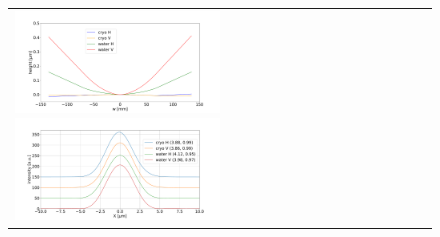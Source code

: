 \documentclass[aps,pra,showpacs,twocolumn,amsmath,amssymb,superscriptaddress,nofootinbib]{revtex4}
\begin{document}
\begin{figure}
\begin{center}
\begin{tabular}{l}
     \includegraphics[width=0.5\textwidth]{figures/correctionprofilesextrapolated.pdf}
   \includegraphics[width=0.5\textwidth]{figures/intensitycorrectedextrapolated.pdf} \\
   \end{tabular}
   \end{center}

   \end{figure} 
\end{document}
